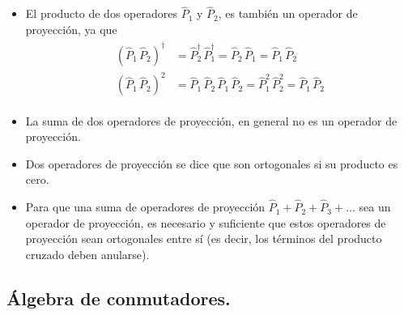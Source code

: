 \begin{itemize}
\item El producto de dos operadores $\hat{P}_{1}$ y $\hat{P}_{2}$, es también un operador de proyección, ya que
\begin{align}
\begin{aligned}
(\hat{P}_{1} \, \hat{P}_{2})^{\dagger} &= \hat{P}_{2}^{\dagger} \, \hat{P}_{1}^{\dagger} = \hat{P}_{2} \, \hat{P}_{1} =  \hat{P}_{1} \, \hat{P}_{2} \\
(\hat{P}_{1} \, \hat{P}_{2})^{2} &= \hat{P}_{1} \, \hat{P}_{2} \, \hat{P}_{1} \, \hat{P}_{2} = \hat{P}_{1}^{2} \, \hat{P}_{2}^{2} = \hat{P}_{1} \, \hat{P}_{2}
\end{aligned}
\label{eq:ecuacion_02_77}
\end{align}
\item La suma de dos operadores de proyección, en general no es un operador de proyección.
\item Dos operadores de proyección se dice que son ortogonales si su producto es cero.
\item Para que una suma de operadores de proyección $\hat{P}_{1} + \hat{P}_{2} + \hat{P}_{3} + \ldots$ sea un operador de proyección, es necesario y suficiente que estos operadores de proyección sean ortogonales entre sí (es decir, los términos del producto cruzado deben anularse).
\end{itemize}

\subsection{Álgebra de conmutadores.}

